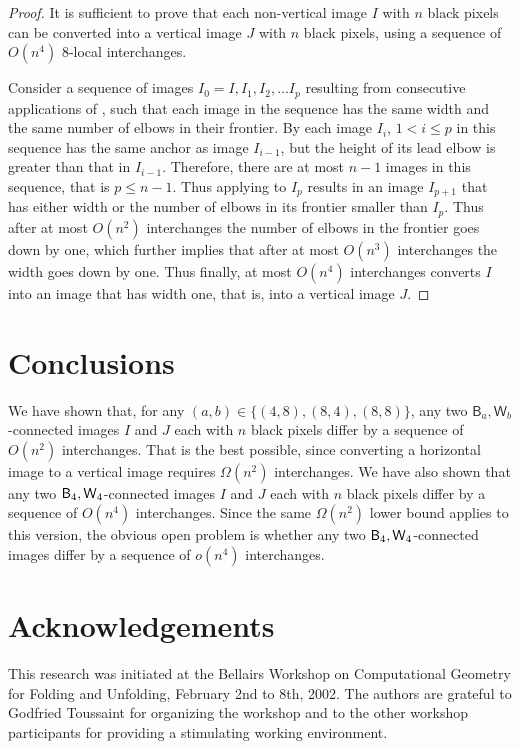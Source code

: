 \documentclass[lotsofwhite,charterfonts]{patmorin}
\newcommand{\fourfour}{\ensuremath{\protect\textup{\textsf{B}}_{4},\protect\textup{\textsf{W}}_{4}}}
\begin{document}
\begin{proof}
It is sufficient to prove that each non-vertical image $I$ with $n$ black pixels can be converted into a vertical image $J$ with $n$ black pixels, using a sequence of $O(n^4)$ 8-local interchanges. 

Consider a sequence of images $I_0=I, I_1, I_2, \dots I_p$ resulting
from consecutive applications of , such that each
image in the sequence has the same width and the same number of elbows
in their frontier. By  each image $I_i$, $1<i\leq p$
in this sequence has the same anchor as image $I_{i-1}$, but the
height of its lead elbow is greater than that in $I_{i-1}$. Therefore,
there are at most $n-1$ images in this sequence, that is $p\leq n-1$.
Thus applying  to $I_p$ results in an image
$I_{p+1}$ that has either width or the number of elbows in its
frontier smaller than $I_p$. Thus after at most $O(n^2)$ interchanges
the number of elbows in the frontier goes down by one, which further
implies that after at most $O(n^3)$ interchanges the width goes down
by one. Thus finally, at most $O(n^4)$ interchanges converts $I$ into
an image that has width one, that is, into a vertical image $J$.
\end{proof}


\section{Conclusions} 

We have shown that, for any $(a,b)\in\{(4,8),(8,4),(8,8)\}$, any two
$\textsf{B}_a,\textsf{W}_b$-connected images $I$ and $J$ each with
$n$ black pixels differ by a sequence of $O(n^2)$ interchanges. That
is the best possible, since converting a horizontal image to a
vertical image requires $\Omega(n^2)$ interchanges. We have also shown
that any two \fourfour-connected images $I$ and $J$ each with $n$
black pixels differ by a sequence of $O(n^4)$ interchanges. Since the
same $\Omega(n^2)$ lower bound applies to this version, the obvious
open problem is whether any two \fourfour-connected images  differ by
a sequence of $o(n^4)$ interchanges.

\section*{Acknowledgements}

This research was initiated at the Bellairs Workshop on Computational
Geometry for Folding and Unfolding, February 2nd to 8th, 2002.  The
authors are grateful to Godfried Toussaint for organizing the workshop
and to the other workshop participants for providing a stimulating
working environment.



\end{document}
